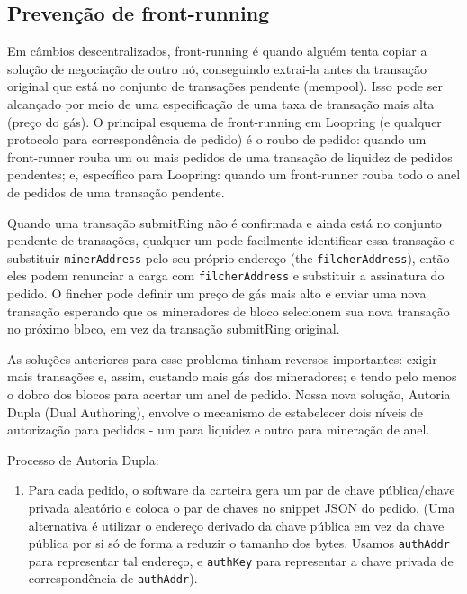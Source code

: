 \documentclass[UTF8,nofonts]{article}
\begin{document}
\begin{multicols}{2}
\subsection{Prevenção de front-running\label{sec:dual_authoring}}

Em câmbios descentralizados, front-running é quando alguém tenta copiar a solução de negociação de outro nó, conseguindo extrai-la antes da transação original que está no conjunto de transações pendente (mempool). Isso pode ser alcançado por meio de uma especificação de uma taxa de transação mais alta (preço do gás). O principal esquema de front-running em Loopring (e qualquer protocolo para correspondência de pedido) é o roubo de pedido: quando um front-runner rouba um ou mais pedidos de uma transação de liquidez de pedidos pendentes; e, específico para Loopring: quando um front-runner rouba todo o anel de pedidos de uma transação pendente.


Quando uma transação submitRing não é confirmada e ainda está no conjunto pendente de transações, qualquer um pode facilmente identificar essa transação e substituir  \verb|minerAddress| pelo seu próprio endereço (the \verb|filcherAddress|), então eles podem renunciar a carga com  \verb|filcherAddress| e substituir a assinatura do pedido. O fincher pode definir um preço de gás mais alto e enviar uma nova transação esperando que os mineradores de bloco selecionem sua nova transação no próximo bloco, em vez da transação submitRing original.

As soluções anteriores para esse problema tinham reversos importantes: exigir mais transações e, assim, custando mais gás dos mineradores; e tendo pelo menos o dobro dos blocos para acertar um anel de pedido. Nossa nova solução, Autoria Dupla (Dual Authoring)\cite{dualauthor}, envolve o mecanismo de estabelecer dois níveis de autorização para pedidos - um para liquidez e outro para mineração de anel.


Processo de Autoria Dupla:


\begin{enumerate}

	\item Para cada pedido, o software da carteira gera um par de chave pública/chave privada aleatório e coloca o par de chaves no snippet JSON do pedido. (Uma alternativa é utilizar o endereço derivado da chave pública em vez da chave pública por si só de forma a reduzir o tamanho dos bytes. Usamos \verb|authAddr|  para representar tal endereço, e \verb|authKey| para representar a chave privada de correspondência de \verb|authAddr|).


\end{enumerate}
\end{multicols}
\end{document}
